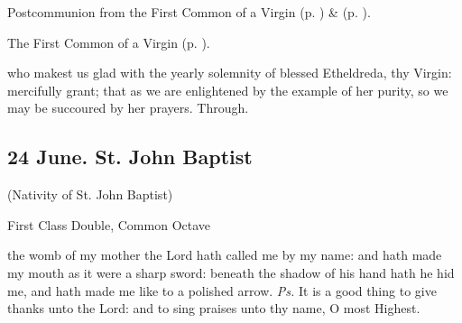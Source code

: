 \begin{rubric}
 Postcommunion  from the First Common of a Virgin (p. \pageref{CommonVirginOnlyIPostcommunion}) \&   (p. \pageref{SPSaints}).
\end{rubric}



\begin{rubric}
	The First Common of a Virgin (p. \pageref{CommonVirginOnlyI}).
\end{rubric}

\collect\label{EtheldraCollect}
 who makest us glad with the yearly solemnity of blessed Etheldreda, thy Virgin: mercifully grant; that as we are enlightened by the example of her purity, so we may be succoured by her prayers. Through.


\clearpage

\subsection{24 June. St. John Baptist}\label{StJohnBaptist}

\centerline{\small{(Nativity of St. John Baptist)}}

\begin{inhead}
	First Class Double, Common Octave
\end{inhead}


\vspace{-0.4\baselineskip}

\introit

\vspace{-0.15\baselineskip}

 the womb of my mother the Lord hath called me by my name: and hath made my mouth as it were a sharp sword: beneath the shadow of his hand hath he hid me, and hath made me like to a polished arrow. \textit{Ps.} It is a good thing to give thanks unto the Lord: and to sing praises unto thy name, O most Highest.

\vspace{-0.4\baselineskip}

\collect

